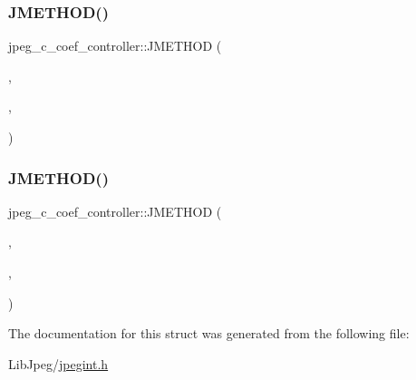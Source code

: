 \subsubsection{\texorpdfstring{JMETHOD()}{JMETHOD()}\hspace{0.1cm}{\footnotesize\ttfamily [1/2]}}
{\footnotesize\ttfamily jpeg\+\_\+c\+\_\+coef\+\_\+controller\+::\+J\+M\+E\+T\+H\+OD (\begin{DoxyParamCaption}\item[{void}]{,  }\item[{\mbox{\hyperlink{jddctmgr_8c_a1964f006adb8fb80f57e455f6452aec1}{start\+\_\+pass}}}]{,  }\item[{(\mbox{\hyperlink{jpeglib_8h_add2a072c54e3a51550f4975f7ddb91e7}{j\+\_\+compress\+\_\+ptr}} cinfo, \mbox{\hyperlink{jpegint_8h_a1f0803342372ac62b6903c399399c874}{J\+\_\+\+B\+U\+F\+\_\+\+M\+O\+DE}} pass\+\_\+mode)}]{ }\end{DoxyParamCaption})}

\mbox{\label{structjpeg__c__coef__controller_a1aaf8a93ba0bd239b36f4d48657c88ee}} 
\subsubsection{\texorpdfstring{JMETHOD()}{JMETHOD()}\hspace{0.1cm}{\footnotesize\ttfamily [2/2]}}
{\footnotesize\ttfamily jpeg\+\_\+c\+\_\+coef\+\_\+controller\+::\+J\+M\+E\+T\+H\+OD (\begin{DoxyParamCaption}\item[{\mbox{\hyperlink{jmorecfg_8h_a7c6368b321bd9acd0149b030bb8275ed}{boolean}}}]{,  }\item[{\mbox{\hyperlink{jccoefct_8c_a1b0b1f4c0a7f4ce97c00607f23977d6c}{compress\+\_\+data}}}]{,  }\item[{(\mbox{\hyperlink{jpeglib_8h_add2a072c54e3a51550f4975f7ddb91e7}{j\+\_\+compress\+\_\+ptr}} cinfo, \mbox{\hyperlink{jpeglib_8h_a4bf858e4d42202287e786bdec2f3b62b}{J\+S\+A\+M\+P\+I\+M\+A\+GE}} input\+\_\+buf)}]{ }\end{DoxyParamCaption})}



The documentation for this struct was generated from the following file\+:\begin{DoxyCompactItemize}
\item 
Lib\+Jpeg/\mbox{\hyperlink{jpegint_8h}{jpegint.\+h}}\end{DoxyCompactItemize}
